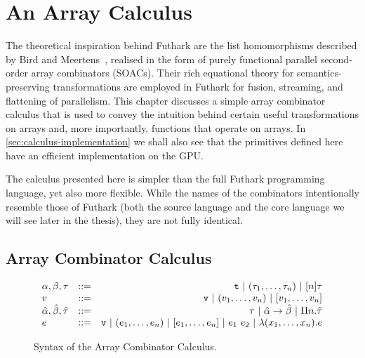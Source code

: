 \newcommand{\czip}{\mathrm{czip}}
\newcommand{\cunzip}{\mathrm{cunzip}}
\newcommand{\cmap}{\mathrm{map}}
\newcommand{\creduce}{\mathrm{reduce}}
\newcommand{\cscan}{\mathrm{scan}}
\newcommand{\cfilter}{\mathrm{scan}}
\newcommand{\inj}{\mathrm{inj}}
\newcommand{\rep}{\mathrm{rep}}
\newcommand{\csFold}{\mathrm{sFold}}
\newcommand{\credomap}{\mathrm{redomap}}
\newcommand{\seg}[1]{\mathbf{#1}}
\newcommand{\tto}{\,\Rightarrow\,}
\newcommand{\iso}{\,\Leftrightarrow\,}
\newcommand{\nat}{\mathbf{N}}
\newcommand{\concat}{\#}
\newcommand{\idd}{\mathrm{id}}
\newcommand{\Id}{\mathrm{id}}
\newcommand{\cfoldl}{\mathrm{foldl}}

\chapter{An Array Calculus}
\label{chap:calculus}

The theoretical inspiration behind Futhark are the list homomorphisms
described by Bird and Meertens~\cite{Bird2}, realised in the form of
purely functional parallel second-order array combinators
(SOACs). Their rich equational theory for semantics-preserving
transformations are employed in Futhark for fusion, streaming, and
flattening of parallelism.  This chapter discusses a simple array
combinator calculus that is used to convey the intuition behind
certain useful transformations on arrays and, more importantly,
functions that operate on arrays.  In
\cref{sec:calculus-implementation} we shall also see that the
primitives defined here have an efficient implementation on the GPU.

The calculus presented here is simpler than the full Futhark
programming language, yet also more flexible.  While the names of the
combinators intentionally resemble those of Futhark (both the source
language and the core language we will see later in the thesis), they
are not fully identical.

\section{Array Combinator Calculus}
\label{sec:arraycombinators}

\begin{figure}
  \centering
$$
\begin{array}{lrr}
  \alpha,\beta,\tau & ::= & \mbox{\texttt{t}}\ |\ (\tau_1, \ldots, \tau_n)\ |\ [n]\tau \\

  v & ::= & \mbox{\texttt{v}}\ |\ (v_{1}, \ldots, v_{n})\ |\ [v_{1}, \ldots, v_{n}] \\

  \hat{\alpha},\hat{\beta},\hat{\tau} &::=& \tau\ |\ \hat{\alpha}\rightarrow\hat{\beta}\ |\ \Pi n.\hat{\tau} \\

  e &::=& \mbox{\texttt{v}}\ |\ (e_{1}, \ldots, e_{n})\ |\ [e_{1}, \ldots, e_{n}]\ |\ e_1~e_2\ |\ \lambda (x_1,\ldots,x_n).e
\end{array}
$$
  \caption{Syntax of the Array Combinator Calculus.}
  \label{fig:arraycalculus_syntax}
\end{figure}

